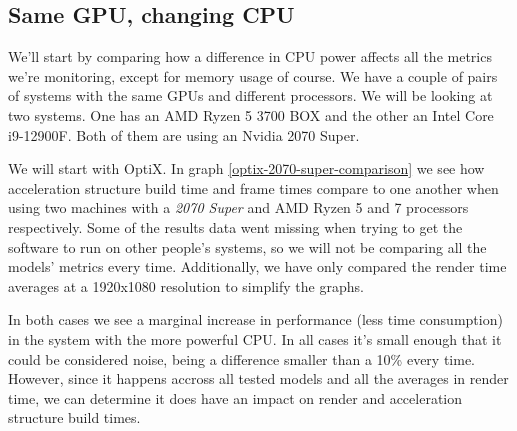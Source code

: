 \subsection{Same GPU, changing CPU}
We'll start by comparing how a difference in CPU power affects all the metrics we're monitoring, except for memory usage of course. We have a couple of pairs of systems with the same GPUs and different processors. We will be looking at two systems. One has an AMD Ryzen 5 3700 BOX and the other an Intel Core i9-12900F. Both of them are using an Nvidia 2070 Super. %

We will start with OptiX. In graph \ref{optix-2070-super-comparison} we see how acceleration structure build time and frame times compare to one another when using two machines with a \textit{2070 Super} and AMD Ryzen 5 and 7 processors respectively. Some of the results data went missing when trying to get the software to run on other people's systems, so we will not be comparing all the models' metrics every time. Additionally, we have only compared the render time averages at a 1920x1080 resolution to simplify the graphs.

In both cases we see a marginal increase in performance (less time consumption) in the system with the more powerful CPU. In all cases it's small enough that it could be considered noise, being a difference smaller than a 10\% every time. However, since it happens accross all tested models and all the averages in render time, we can determine it does have an impact on render and acceleration structure build times.

